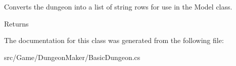 Converts the dungeon into a list of string rows for use in the {\ttfamily Model} class. 

\begin{DoxyReturn}{Returns}

\end{DoxyReturn}


The documentation for this class was generated from the following file\+:\begin{DoxyCompactItemize}
\item 
src/\+Game/\+Dungeon\+Maker/Basic\+Dungeon.\+cs\end{DoxyCompactItemize}
